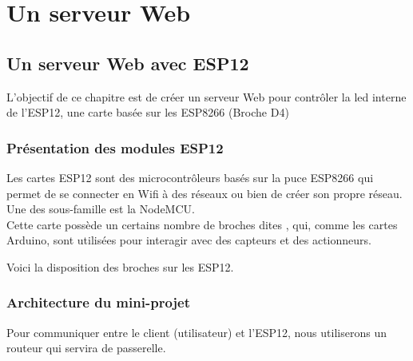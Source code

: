 \part{Un serveur Web}
\chapter{Un serveur Web avec ESP12}

L'objectif de ce chapitre est de créer un serveur Web pour contrôler la led interne de l'ESP12, une carte basée sur les ESP8266 
(Broche D4)




\section{Présentation des modules ESP12}


Les cartes ESP12 sont des microcontrôleurs basés sur la puce ESP8266 
qui permet de se connecter en Wifi à des réseaux ou bien de créer son propre réseau.
Une des sous-famille est la NodeMCU.\\

Cette carte possède un certains nombre de broches dites , qui, comme les cartes Arduino, 
sont utilisées pour interagir avec des capteurs et des actionneurs.

Voici la disposition des broches sur les ESP12.



\section{Architecture du mini-projet}

Pour communiquer entre le client (utilisateur) et l'ESP12, nous utiliserons un routeur qui servira de passerelle.


